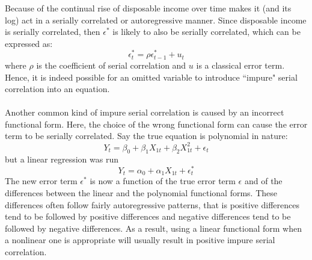 \documentclass[11pt]{article}
\begin{document}
Because of the continual rise of disposable income over time makes it (and its log) act in a serially correlated or autoregressive manner. Since disposable income is serially correlated, then $\epsilon^*$ is likely to also be serially correlated, which can be expressed as:
$$
\epsilon_t^* = \rho \epsilon^*_{t-1} + u_t
$$
where $\rho$ is the coefficient of serial correlation and $u$ is a classical error term. Hence, it is indeed possible for an omitted variable to introduce ``impure" serial correlation into an equation.\\ \\
Another common kind of impure serial correlation is caused by an incorrect functional form. Here, the choice of the wrong functional form can cause the error term to be serially correlated. Say the true equation is polynomial in nature:
\begin{equation}
Y_t = \beta_0 + \beta_1X_{1t} + \beta_2X_{1t}^2 + \epsilon_t 
\label{eg9_7} 
\end{equation}
but a linear regression was run
\begin{equation}
Y_t = \alpha_0 + \alpha_1X_{1t} + \epsilon_t^* \label{eg9_8}
\end{equation}
The new error term $\epsilon^*$ is now a function of the true error term $\epsilon$ and of the differences between the linear and the polynomial functional forms. These differences often follow fairly autoregressive patterns, that is positive differences tend to be followed by positive differences and negative differences tend to be followed by negative differences. As a result, using a linear functional form when a nonlinear one is appropriate will usually result in positive impure serial correlation.
\end{document}
